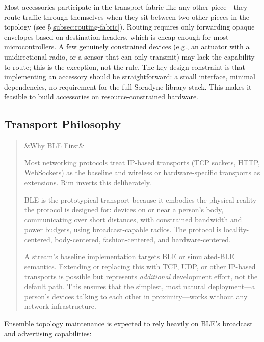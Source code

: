 \documentclass[11pt, letterpaper]{article}
\newenvironment{designnote}[1][]
  {\par\medskip\begin{quote}\small
   \ifx&#1&\else\noindent{\bfseries\color{jetcolor} #1}\par\smallskip\fi}
  {\end{quote}\medskip}
\begin{document}
Most accessories participate in the transport fabric like any other piece---they route
traffic through themselves when they sit between two other pieces in the topology
(see \S\ref{subsec:routing-fabric}). Routing requires only forwarding opaque envelopes
based on destination headers, which is cheap enough for most microcontrollers. A few
genuinely constrained devices (e.g., an actuator with a unidirectional radio, or a
sensor that can only transmit) may lack the capability to route; this is the exception,
not the rule. The key design constraint is that implementing an accessory should be
straightforward: a small interface, minimal dependencies, no requirement for the full
Soradyne library stack. This makes it feasible to build accessories on
resource-constrained hardware.

\subsection{Transport Philosophy}
\label{subsec:transport-philosophy}

\begin{designnote}[Why BLE First]
Most networking protocols treat IP-based transports (TCP sockets, HTTP, WebSockets) as
the baseline and wireless or hardware-specific transports as extensions. Rim inverts
this deliberately.

BLE is the prototypical transport because it embodies the physical reality the protocol
is designed for: devices on or near a person's body, communicating over short distances,
with constrained bandwidth and power budgets, using broadcast-capable radios. The
protocol is locality-centered, body-centered, fashion-centered, and hardware-centered.

A stream's baseline implementation targets BLE or simulated-BLE semantics. Extending or
replacing this with TCP, UDP, or other IP-based transports is possible but represents
\emph{additional} development effort, not the default path. This ensures that the
simplest, most natural deployment---a person's devices talking to each other in
proximity---works without any network infrastructure.
\end{designnote}

Ensemble topology maintenance is expected to rely heavily on BLE's broadcast and
advertising capabilities:
\end{document}

